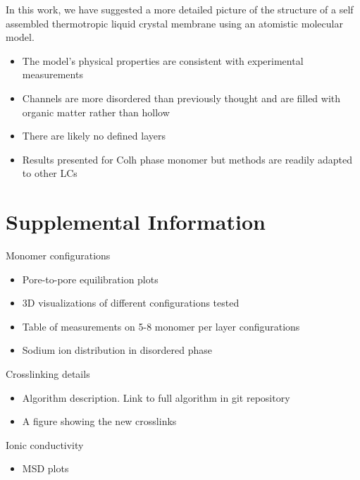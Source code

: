 \documentclass{article}
\begin{document}
	In this work, we have suggested a more detailed picture of the structure of a self assembled thermotropic liquid crystal membrane using an atomistic molecular model.
	\begin{itemize}
		\item The model's physical properties are consistent with experimental measurements
		\item Channels are more disordered than previously thought and are filled with organic matter rather than hollow 
		\item There are likely no defined layers
		\item Results presented for Colh phase monomer but methods are readily adapted to other LCs
	\end{itemize}
	
	\section{Supplemental Information}
	
	Monomer configurations
	\begin{itemize}
		\item Pore-to-pore equilibration plots
		\item 3D visualizations of different configurations tested
		\item Table of measurements on 5-8 monomer per layer configurations
		\item Sodium ion distribution in disordered phase
	\end{itemize}
	
	\noindent Crosslinking details
	\begin{itemize}
		\item Algorithm description. Link to full algorithm in git repository
		\item A figure showing the new crosslinks
	\end{itemize}
	
	\noindent Ionic conductivity %
	\begin{itemize}
		\item MSD plots
	\end{itemize}
\end{document}

